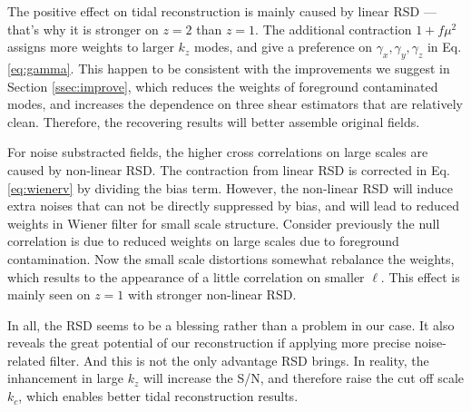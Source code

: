 The positive effect on tidal reconstruction is mainly caused by linear RSD
---that's why it is stronger on $z=2$ than $z=1$. 
The additional contraction $1+f\mu^2$ 
assigns more weights to larger $k_z$ modes, 
and give a preference on $\gamma_x,\gamma_y,\gamma_z$ in Eq.\ref{eq:gamma}.  
This happen to be consistent with the improvements we suggest in Section 
\ref{ssec:improve}, 
which reduces the weights of foreground contaminated modes, 
and increases the dependence on three shear estimators 
that are relatively clean. 
Therefore, the recovering results will better assemble original fields. 

For noise substracted fields, the higher cross correlations on large scales 
are caused by non-linear RSD. 
The contraction from linear RSD is corrected in Eq.\ref{eq:wienerv} 
by dividing the bias term. 
However, the non-linear RSD will induce extra noises that can not be 
directly suppressed by bias, and will lead to reduced weights in Wiener filter 
for small scale structure. 
Consider previously the null correlation is due to reduced weights on large scales due to foreground contamination. 
Now the small scale distortions somewhat rebalance the weights, 
which results to the appearance of a little correlation on smaller $\ell$. 
This effect is mainly seen on $z=1$ with stronger non-linear RSD.

In all, the RSD seems to be a blessing rather than a problem in our case. 
It also reveals the great potential of our reconstruction 
if applying more precise noise-related filter.  
And this is not the only advantage RSD brings. 
In reality, the inhancement in large $k_z$ will increase the S/N, 
and therefore raise the cut off scale $k_c$, which enables better tidal reconstruction results. 
